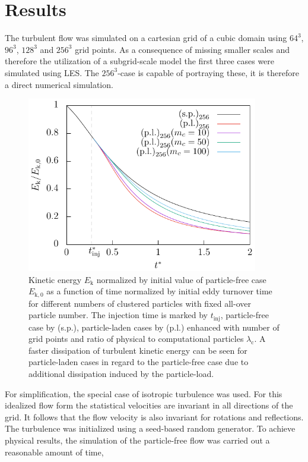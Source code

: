 \documentclass[11pt,a4paper,openany,oneside,parskip=half*]{article}
\begin{document}
\section{Results}
The turbulent flow was simulated on a cartesian grid of a cubic domain using $64^3$, $96^3$, $128^3$ and $256^3$ grid points. As a consequence of missing smaller scales and therefore the utilization of a subgrid-scale model the first three cases were simulated using LES. The $256^3$-case is capable of portraying these, it is therefore a direct numerical simulation. 
\begin{figure}[h]
	\centering
  \includegraphics[width=0.9\textwidth]{./Abbildungen/256/kineticEnergy_time.pdf}
	\caption{Kinetic energy $E_\mathrm{k}$ normalized by initial value of particle-free case $E_\mathrm{k,0}$ as a function of time normalized by initial eddy turnover time for different numbers of clustered particles with fixed all-over particle number. The injection time is marked by $t_\mathrm{inj}$, particle-free case by (s.p.), particle-laden cases by (p.l.) enhanced with number of grid points and ratio of physical to computational particles $\lambda_\mathrm{c}$. A faster dissipation of turbulent kinetic energy can be seen for particle-laden cases in regard to the particle-free case due to additional dissipation induced by the particle-load.}
	\label{kineticEnergy_time_128}
\end{figure}
\newline
For simplification, the special case of isotropic turbulence was used. For this idealized flow form the statistical 
velocities are invariant in all directions of the grid. It follows that the flow velocity is also invariant for rotations and reflections. 
The turbulence was initialized using a seed-based random generator. To achieve physical results, the simulation of the particle-free flow was carried out a reasonable amount of time, 
\end{document}

